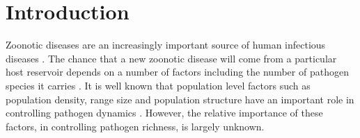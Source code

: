 

\section{Introduction}











Zoonotic diseases are an increasingly important source of human infectious diseases \cite{jones2008global, woolhouse2006host, taylor2001risk}.
The chance that a new zoonotic disease will come from a particular host reservoir depends on a number of factors including the number of pathogen species it carries \cite{wolfe2000deforestation}.
It is well known that population level factors such as population density, range size and population structure have an important role in controlling pathogen dynamics \cite{anderson1979population, may1979population, colizza2007invasion, may2001infection}.
However, the relative importance of these factors, in controlling pathogen richness, is largely unknown.


